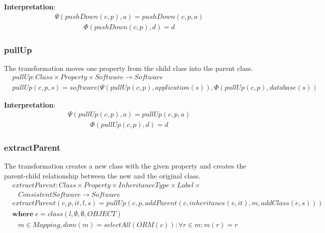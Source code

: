 \documentclass[10pt]{article}
\begin{document}
\noindent \textbf{Interpretation}:
\begin{align}
\Psi(pushDown(c, p), a) = pushDown(c, p, a)
\end{align}
\begin{align}
\Phi(pushDown(c, p), d) = d
\end{align}

\subsubsection{pullUp}
The transformation moves one property from the child class into the parent class.
\begin{align}
& pullUp: Class \times Property \times Software \rightarrow Software \nonumber \\
& pullUp(c, p, s) = software(\Psi(pullUp(c, p), application(s)), \Phi(pullUp(c, p), database(s))
\end{align}

\noindent \textbf{Interpretation}:
\begin{align}
\Psi(pullUp(c, p), a) = pullUp(c, p, a)
\end{align}
\begin{align}
\Phi(pullUp(c, p), d) = d
\end{align}

\subsubsection{extractParent}
The transformation creates a new class with the given property and creates the parent-child relationship between the new and the original class.
\begin{align}
& extractParent: Class \times Property \times InheritanceType \times Label \times  \nonumber \\
& \;\;\; ConsistentSoftware \rightarrow Software \\
& extractParent(c, p, it, l, s) = pullUp(c, p, addParent(c,inheritance(e, it), m,  addClass(e, s))) \\
& \mathbf{where} \; e = class(l, \emptyset, \emptyset, OBJECT)  \nonumber \\
& \;\;\; m \in Mapping, dom(m) = selectAll(ORM(c)) : \forall r \in m :  m(r) = r \nonumber
\end{align}
\end{document}
